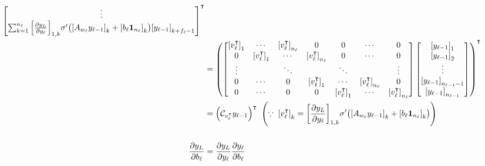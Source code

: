 \documentclass[10pt]{article}
\begin{document}
\begin{enumerate}[(a)]
\begin{align*}
\begin{bmatrix}
            \vdots \\
            \sum_{k=1}^{n_\ell}\qty[\frac{\partial y_L}{\partial y_\ell}]_{1, k}\sigma'\qty(\qty[A_{w_\ell}y_{\ell-1}]_k + \qty[b_\ell\mathbf{1}_{n_\ell}]_k)\qty[y_{\ell-1}]_{k+f_\ell-1}
        \end{bmatrix}^\intercal \\
        &= \qty(\begin{bmatrix}
            \qty[v_\ell^\intercal]_1 & \cdots                   & \qty[v_\ell^\intercal]_{n_\ell} & 0                               & 0                        & \cdots                          & 0      \\
            0                        & \qty[v_\ell^\intercal]_1 & \cdots                          & \qty[v_\ell^\intercal]_{n_\ell} & 0                        & \cdots                          & 0      \\
            \vdots                   &                          & \ddots                          &                                 & \ddots                   &                                 & \vdots \\
            0                        & \cdots                   & 0                               & \qty[v_\ell^\intercal]_1        & \cdots                   & \qty[v_\ell^\intercal]_{n_\ell} & 0      \\
            0                        & \cdots                   & 0                               & 0                               & \qty[v_\ell^\intercal]_1 & \cdots                          & \qty[v_\ell^\intercal]_{n_\ell}
        \end{bmatrix}\begin{bmatrix}
            \qty[y_{\ell-1}]_{1} \\ 
            \qty[y_{\ell-1}]_{2} \\ 
            \vdots \\
            \qty[y_{\ell-1}]_{n_{\ell-1}-1} \\ 
            \qty[y_{\ell-1}]_{n_{\ell-1}}
        \end{bmatrix})^\intercal \\ 
        &= \qty(\mathcal{C}_{v_\ell^\intercal}y_{\ell-1})^\intercal \;\; \qty(\because \; \qty[v_\ell^\intercal]_k = \qty[\frac{\partial y_L}{\partial y_\ell}]_{1, k}\sigma'\qty(\qty[A_{w_\ell}y_{\ell-1}]_k + \qty[b_\ell\mathbf{1}_{n_\ell}]_k)) \\ \\
        \frac{\partial y_L}{\partial b_\ell} &= \frac{\partial y_L}{\partial y_\ell}\frac{\partial y_\ell}{\partial b_\ell} \\

\end{align*}
\end{enumerate}
\end{document}
